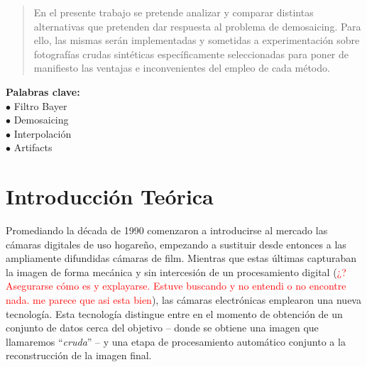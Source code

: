 \documentclass[a4paper]{article}
\begin{document}
\thispagestyle{empty}

\maketitle
\newpage

\thispagestyle{empty}
\vfill
\begin{abstract}
En el presente trabajo se pretende analizar y comparar distintas alternativas que pretenden dar respuesta al problema de demosaicing. Para ello, las mismas serán implementadas y sometidas a experimentación sobre fotografías crudas sintéticas específicamente seleccionadas para poner de manifiesto las ventajas e inconvenientes del empleo de cada método. \\
\end{abstract}

\textbf{Palabras clave:} \\
$\bullet$ Filtro Bayer \\
$\bullet$ Demosaicing \\
$\bullet$ Interpolaci\'on \\
$\bullet$ Artifacts \\



\thispagestyle{empty}
\vspace{3cm}
\tableofcontents
\newpage


\newpage

\section{Introducci\'on Te\'orica}

Promediando la década de 1990 comenzaron a introducirse al mercado las cámaras digitales de uso hogareño, empezando a sustituir desde entonces a las ampliamente difundidas cámaras de film. 
Mientras que estas últimas capturaban la imagen de forma mecánica y sin intercesión de un procesamiento digital (\textcolor{red}{¿? Asegurarse cómo es y explayarse. Estuve buscando y no entendi o no encontre nada. me parece que asi esta bien}), las cámaras electrónicas emplearon una nueva tecnología. Esta tecnolog\'ia distingue entre en el momento de obtención de un conjunto de datos cerca del objetivo – donde se obtiene una imagen que llamaremos “\textit{cruda}” – y una etapa de procesamiento automático conjunto a la reconstrucción de la imagen final. \\
\end{document}
